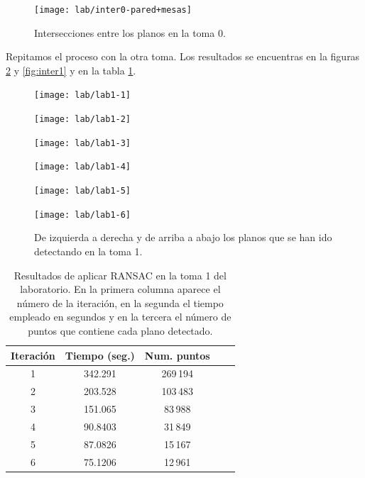 \begin{figure}[h!]
		\centering
		\texttt{[image: lab/inter0-pared+mesas]} 
		\caption{Intersecciones entre los planos en la toma 0.}
		\label{fig:inter0}
\end{figure}

Repitamos el proceso con la otra toma. Los resultados se encuentras en la figuras \ref{fig:planos-lab1} y \ref{fig:inter1} y en la tabla \ref{table:res-lab1}. \\

\begin{figure}[h!]
	\begin{minipage}{0.5\textwidth}
		\centering
		\texttt{[image: lab/lab1-1]} 
	\end{minipage}
	\begin{minipage}{0.5\textwidth}
		\centering
		\texttt{[image: lab/lab1-2]} 
	\end{minipage}
	\begin{minipage}{0.5\textwidth}
		\centering
		\texttt{[image: lab/lab1-3]} 
	\end{minipage}
	\begin{minipage}{0.5\textwidth}
		\centering
		\texttt{[image: lab/lab1-4]} 
	\end{minipage}
	\begin{minipage}{0.5\textwidth}
		\centering
		\texttt{[image: lab/lab1-5]} 
	\end{minipage}
	\begin{minipage}{0.5\textwidth}
		\centering
		\texttt{[image: lab/lab1-6]} 
	\end{minipage}
	\caption{De izquierda a derecha y de arriba a abajo los planos que se han ido detectando en la toma 1.}
	\label{fig:planos-lab1}
\end{figure}

\begin{table}[h!]
	\centering
	\begin{tabular}{| c | c | c | c | c |} 
		\hline
		Iteración  & Tiempo (seg.) & Num. puntos \\
		\hline
		1 & 342.291 & 269\,194 \\				  
		2 & 203.528  & 103\,483  \\	
		3 & 151.065 &  83\,988 \\
		4 & 90.8403 &  31\,849\\
		5 & 87.0826 & 15\,167 \\
		6 & 75.1206 & 12\,961 \\
		\hline
	\end{tabular}
	\caption{Resultados de aplicar RANSAC en la toma 1 del laboratorio. En la primera columna aparece el número de la iteración, en la segunda el tiempo empleado en segundos y en la tercera el número de puntos que contiene cada plano detectado.}
	\label{table:res-lab1}
\end{table}

